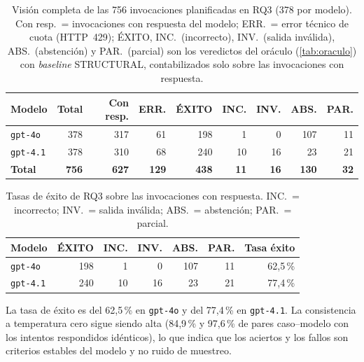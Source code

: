 \begin{table}[ht]
\centering
\small
\caption{Visión completa de las 756 invocaciones planificadas en RQ3
(378 por modelo). Con resp.\ = invocaciones con respuesta del modelo;
ERR.\ = error técnico de cuota (HTTP~429); ÉXITO, INC.\ (incorrecto),
INV.\ (salida inválida), ABS.\ (abstención) y PAR.\ (parcial) son los
veredictos del oráculo (\autoref{tab:oraculo}) con \emph{baseline} STRUCTURAL,
contabilizados solo sobre las invocaciones con respuesta.}
\label{tab:rq3-completo}
\begin{tabular}{@{}lrrrrrrrr@{}}
\toprule
\textbf{Modelo} & \textbf{Total} & \textbf{Con resp.} & \textbf{ERR.} & \textbf{ÉXITO} & \textbf{INC.} & \textbf{INV.} & \textbf{ABS.} & \textbf{PAR.} \\
\midrule
\texttt{gpt-4o}  & 378 & 317 & 61 & 198 & 1  & 0  & 107 & 11 \\
\texttt{gpt-4.1} & 378 & 310 & 68 & 240 & 10 & 16 & 23  & 21 \\
\midrule
\textbf{Total}   & \textbf{756} & \textbf{627} & \textbf{129} & \textbf{438} & \textbf{11} & \textbf{16} & \textbf{130} & \textbf{32} \\
\bottomrule
\end{tabular}
\end{table}

\begin{table}[ht]
\centering
\caption{Tasas de éxito de RQ3 sobre las invocaciones con respuesta.
INC.\ = incorrecto; INV.\ = salida inválida; ABS.\ = abstención; PAR.\ = parcial.}
\label{tab:rq3-modelo}
\begin{tabular}{@{}lrrrrrr@{}}
\toprule
\textbf{Modelo} & \textbf{ÉXITO} & \textbf{INC.} & \textbf{INV.} & \textbf{ABS.} & \textbf{PAR.} & \textbf{Tasa éxito} \\
\midrule
\texttt{gpt-4o}  & 198 & 1  & 0  & 107 & 11 & 62{,}5\,\% \\
\texttt{gpt-4.1} & 240 & 10 & 16 & 23  & 21 & 77{,}4\,\% \\
\bottomrule
\end{tabular}
\end{table}

La tasa de éxito es del 62{,}5\,\% en \texttt{gpt-4o} y del 77{,}4\,\% en
\texttt{gpt-4.1}. La consistencia a temperatura cero sigue siendo alta
(84{,}9\,\% y 97{,}6\,\% de pares caso--modelo con los intentos respondidos
idénticos), lo que indica que los aciertos y los fallos son criterios estables
del modelo y no ruido de muestreo.

